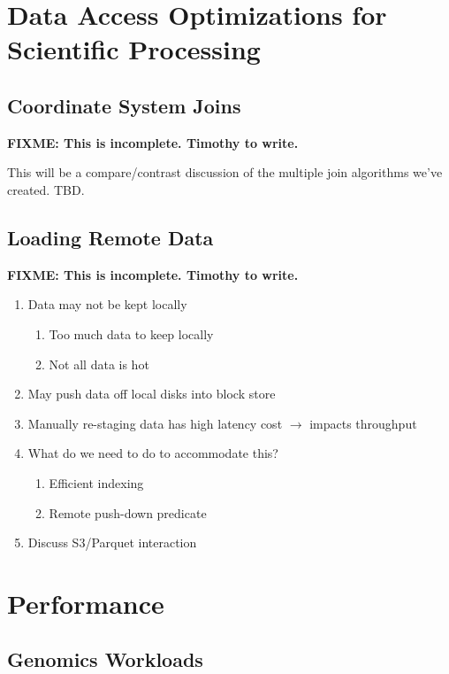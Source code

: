 \documentclass{acm_proc_article-sp}
\begin{document}
\section{Data Access Optimizations for \\ Scientific Processing}
\label{sec:optimizations-scientific-processing}

\subsection{Coordinate System Joins}
\label{sec:coordinate-system-joins}

\textbf{FIXME: This is incomplete. Timothy to write.}

This will be a compare/contrast discussion of the multiple join algorithms we've created. TBD.

\subsection{Loading Remote Data}
\label{sec:loading-remote-data}

\textbf{FIXME: This is incomplete. Timothy to write.}

\begin{enumerate}
\item Data may not be kept locally
\begin{enumerate}
\item Too much data to keep locally
\item Not all data is hot
\end{enumerate}
\item May push data off local disks into block store
\item Manually re-staging data has high latency cost $\rightarrow$ impacts throughput
\item What do we need to do to accommodate this?
\begin{enumerate}
\item Efficient indexing
\item Remote push-down predicate
\end{enumerate}
\item Discuss S3/Parquet interaction
\end{enumerate}

\section{Performance}
\label{sec:performance}


\subsection{Genomics Workloads}
\label{sec:genomics-performance}
\end{document}
